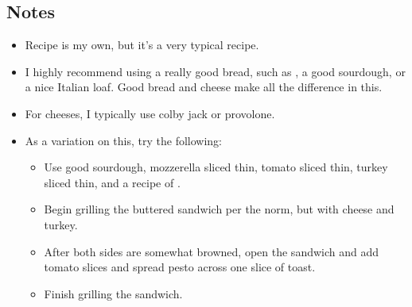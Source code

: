 \begin{multicols}{2}
\subsection*{Notes}
\begin{itemize}
    \item Recipe is my own, but it's a very typical recipe.
    \item I highly recommend using a really good bread, such as , a good sourdough, or a nice Italian loaf. Good bread and cheese make all the difference in this.
    \item For cheeses, I typically use colby jack or provolone.
    \item As a variation on this, try the following:
    \begin{itemize}
        \item Use good sourdough, mozzerella sliced thin, tomato sliced thin, turkey sliced thin, and a recipe of .
        \item Begin grilling the buttered sandwich per the norm, but with cheese and turkey.
        \item After both sides are somewhat browned, open the sandwich and add tomato slices and spread pesto across one slice of toast.
        \item Finish grilling the sandwich.
    \end{itemize}
\end{itemize}
\end{multicols}
\clearpage